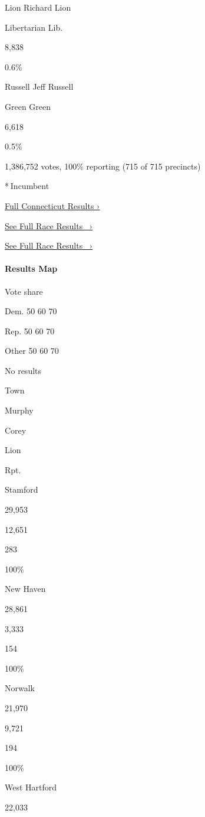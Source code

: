  Lion Richard Lion

Libertarian Lib.

8,838

0.6\%

 Russell Jeff Russell

Green Green

6,618

0.5\%

1,386,752 votes, 100\% reporting (715 of 715 precincts)

* Incumbent

\href{https://www.nytimes3xbfgragh.onion/interactive/2018/11/06/us/elections/results-connecticut-elections.html}{Full
Connecticut Results ›}

\href{https://www.nytimes3xbfgragh.onion/elections/results/connecticut-senate}{See
Full Race Results~ ›}

\href{https://www.nytimes3xbfgragh.onion/elections/results/connecticut-senate}{See
Full Race Results~ ›}

\hypertarget{results-map}{%
\paragraph{Results Map}\label{results-map}}

Vote share

Dem. 50 60 70

Rep. 50 60 70

Other 50 60 70

No results

Town

Murphy

Corey

Lion

Rpt.

Stamford

29,953

12,651

283

100\%

New Haven

28,861

3,333

154

100\%

Norwalk

21,970

9,721

194

100\%

West Hartford

22,033

